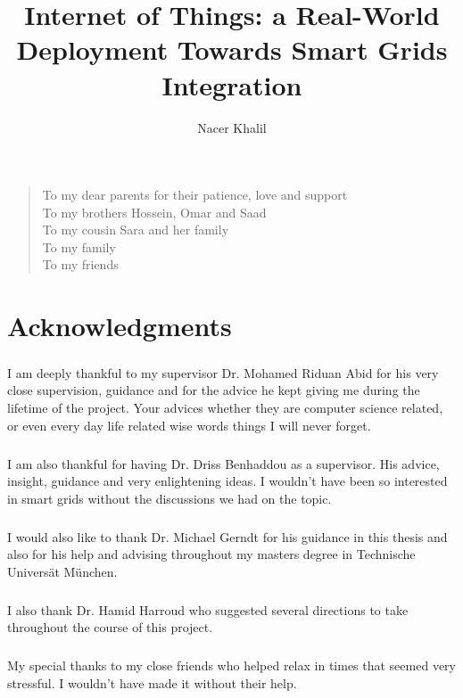 \documentclass[oneside,12pt,a4paper,final]{book}
\author{Nacer Khalil}
\title{Internet of Things: a Real-World Deployment Towards Smart Grids Integration}
\newenvironment{dedication}{\vspace{6ex}\begin{quotation}\begin{center}\begin{em}}{\par\end{em}\end{center}\end{quotation}}
\begin{document}
\doublespacing

\frontmatter


\chapter{} %
\begin{dedication}
To my dear parents for their patience, love and support \\
To my brothers Hossein, Omar and Saad \\
To my cousin Sara and her family \\
To my family \\
To my friends \\

\end{dedication}
\chapter{Acknowledgments}
\paragraph{}
I am deeply thankful to my supervisor Dr. Mohamed Riduan Abid for his very close supervision, guidance and for the advice he kept giving me during the lifetime of the project. Your advices whether they are computer science related, or even every day life related wise words things I will never forget.
\paragraph{}
I am also thankful for having Dr. Driss Benhaddou as a supervisor. His advice, insight, guidance and very enlightening ideas. I wouldn't have been so interested in smart grids without the discussions we had on the topic.
\paragraph{}
I would also like to thank Dr. Michael Gerndt for his guidance in this thesis and also for his help and advising throughout my masters degree in Technische Universät München.
\paragraph{}
I  also thank Dr. Hamid Harroud who suggested several directions to take throughout the course of this project.
\paragraph{}
My special thanks to my close friends who helped relax in times that seemed very stressful. I wouldn't have made it without their help.
\end{document}
